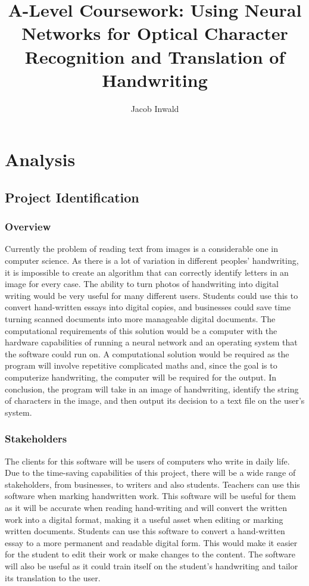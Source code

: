 \documentclass{report}
\title{A-Level Coursework: Using Neural Networks for Optical Character Recognition and Translation of Handwriting}
\author{Jacob Inwald}
\begin{document}
\maketitle

\pagebreak

\tableofcontents

\newpage

\chapter{Analysis}

\section{Project Identification}
\subsection{Overview}
Currently the problem of reading text from images is a considerable one in computer science. As there is a lot of variation in different peoples' handwriting, it is impossible to create an algorithm that can correctly identify letters in an image for every case. The ability to turn photos of handwriting into digital writing would be very useful for many different users. Students could use this to convert hand-written essays into digital copies, and businesses could save time turning scanned documents into more manageable digital documents.
\newline
The computational requirements of this solution would be a computer with the hardware capabilities of running a neural network and an operating system that the software could run on. A computational solution would be required as the program will involve repetitive complicated maths and, since the goal is to computerize handwriting, the computer will be required for the output. 
\newline
In conclusion, the program will take in an image of handwriting, identify the string of characters in the image, and then output its decision to a text file on the user's system.

\subsection{Stakeholders}
The clients for this software will be users of computers who write in daily life. Due to the time-saving capabilities of this project, there will be a wide range of stakeholders, from businesses, to writers and also students. 
\newline
Teachers can use this software when marking handwritten work. This software will be useful for them as it will be accurate when reading hand-writing and will convert the written work into a digital format, making it a useful asset when editing or marking written documents.
\newline
Students can use this software to convert a hand-written essay to a more permanent and readable digital form. This would make it easier for the student to edit their work or make changes to the content. The software will also be useful as it could train itself on the student's handwriting and tailor its translation to the user.
\end{document}
